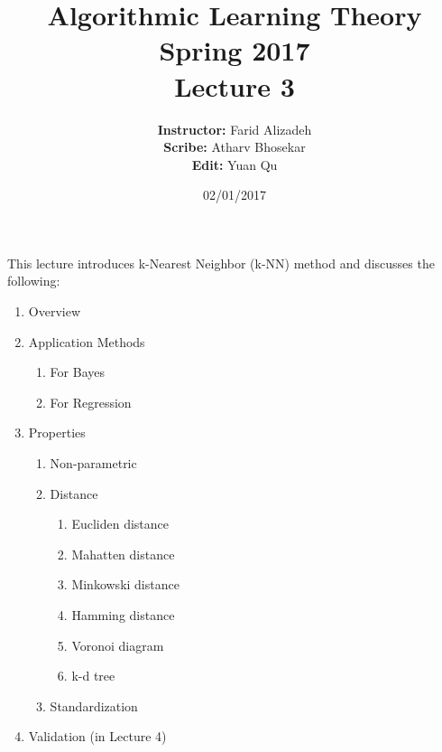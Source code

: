 \documentclass{article}
\title{ 
    Algorithmic Learning Theory\\
    Spring 2017\\
    Lecture 3
}
\author{
    {\bf Instructor:} Farid Alizadeh\\
    {\bf Scribe:} Atharv Bhosekar\\
    {\bf Edit:} Yuan Qu\\
}
\date{02/01/2017}
\begin{document}
\pagestyle{fancy}



\maketitle

\medskip

This lecture introduces k-Nearest Neighbor (k-NN) method and discusses the following:  


\begin{enumerate}
    \item Overview
    \item Application Methods
        \begin{enumerate}
            \item For Bayes
            \item For Regression
        \end{enumerate}
    \item Properties
        \begin{enumerate}
            \item Non-parametric
            \item Distance
                \begin{enumerate}
                    \item Eucliden distance
                    \item Mahatten distance
                    \item Minkowski distance
                    \item Hamming distance
                    \item Voronoi diagram
                    \item k-d tree
                \end{enumerate}
            \item Standardization
        \end{enumerate}
    \item Validation (in Lecture 4)
\end{enumerate}     
\end{document}
